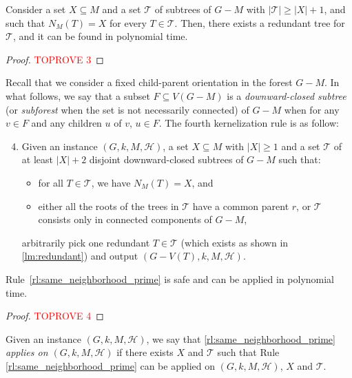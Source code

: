 \documentclass{amsart}
\newcommand{\KR}[1]{KR$_ #1$}
\newcommand{\T}{\mathcal{T}}
\newcommand{\mT}{\mathcal{T}}
\newcommand{\mH}{\mathcal{H}}
\newcommand{\ruleref}[1]{\hyperref[#1]{\ref*{#1}}}
\begin{document}
\begin{lemma}\label{lm:redundant}
    Consider a set $X\subseteq M$ and a set $\T$ of subtrees of $G-M$ with $|\T|\geq|X|+1$, and such that $N_M(T)=X$ for every $T\in \T$. Then, there exists a redundant tree for $\T$, and it can be found in polynomial time.
\end{lemma}
\begin{proof}\textcolor{red}{TOPROVE 3}\end{proof}

Recall that we consider a fixed child-parent orientation in the forest $G-M$. In what follows, we say that a subset $F \subseteq V(G-M)$ is a \emph{downward-closed subtree} (or \emph{subforest} when the set is not necessarily connected) of $G-M$ when for any $v \in F$ and any children $u$ of $v$, $u \in F$.
The fourth kernelization rule is as follow:

\begin{enumerate}[label=(\KR{{\arabic*}})]
\setcounter{enumi}{3}
\item \label{rl:same_neighborhood_prime} Given an instance $(G, k, M, \mH)$, a set $X\subseteq M$ with $|X|\geq 1$ and a set $\T$ of at least $|X|+2$ disjoint downward-closed subtrees of $G-M$ such that:
\begin{itemize}
    \item for all $T\in \T$, we have $N_M(T)=X$, and
    \item either all the roots of the trees in $\T$ have a common parent $r$, or $\T$ consists only in connected components of $G-M$,
\end{itemize}
arbitrarily pick one 
redundant $T\in \T$ (which exists as shown in \autoref{lm:redundant}) and output $(G - V(T), k, M, \mH)$.
\end{enumerate}

\begin{lemma}
    Rule~\ruleref{rl:same_neighborhood_prime} is safe and can be applied in polynomial time.
\end{lemma}

\begin{proof}\textcolor{red}{TOPROVE 4}\end{proof}


\begin{definition}
    Given an instance $(G,k, M, \mH)$, we say that  \ruleref{rl:same_neighborhood_prime} \emph{applies on $(G,k,M,\mH)$}
    if there exists $X$ and $\mT$ such that Rule \ruleref{rl:same_neighborhood_prime} can be applied on $(G,k,M,\mH)$, $X$ and $\mT$.
\end{definition}
\end{document}
